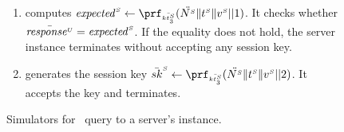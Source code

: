 \begin{figure}[H]
\begin{center}
\begin{tcolorbox}[enhanced,width=3.3in, left=0.1cm,
    drop fuzzy shadow southwest,
    colframe=black,colback=white]
{{\begin{itemize}[leftmargin=.4cm]
\begin{enumerate}
 \item computes $\VS{\mathit{expected}} \gets \prf_{\sss\bar{\VS{\keyt_{\sss3}}}}(\ddot{\VS{\nonce}}  \| \VS{\trans} \| \VS{\verifier}|| 1)$. It checks whether  $ \bar{\mathit{response}^{\scriptscriptstyle U}}=\mathit{expected}^{\scriptscriptstyle S}$. If the equality does not hold, the server instance terminates without accepting any session key. 
  \item generates the session key $\bar {sk}^{\sss S} \gets \prf_{\sss\bar{\VS{\keyt_{\sss3}}}}(\ddot{\VS{\nonce}}  \| \VS{\trans} \| \VS{\verifier}|| 2)$. 
It accepts the key and terminates.
%
  \end{enumerate}
 \end{itemize} 
}}
\end{tcolorbox}
\end{center}
\caption{Simulators for \send\ query to  a server's instance.} 
\label{fig::Send-sim-to-server}
\end{figure}

